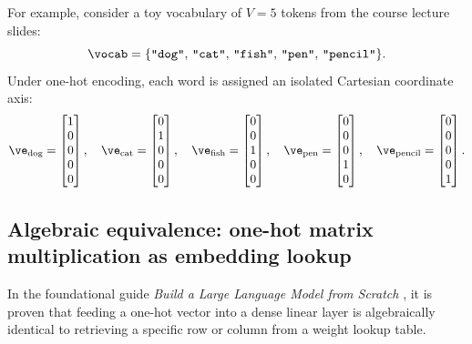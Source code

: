 \documentclass[../../main.tex]{subfiles}
\begin{document}
For example, consider a toy vocabulary of $V=5$ tokens from the course lecture slides:
\begin{equation}
\label{eq:toy_vocab}
\vocab = \{\text{\texttt{"dog"}}, \, \text{\texttt{"cat"}}, \, \text{\texttt{"fish"}}, \, \text{\texttt{"pen"}}, \, \text{\texttt{"pencil"}}\}.
\end{equation}
Under one-hot encoding, each word is assigned an isolated Cartesian coordinate axis:
\begin{equation}
\label{eq:toy_onehots}
\ve_{\text{dog}} = \begin{bmatrix} 1 \\ 0 \\ 0 \\ 0 \\ 0 \end{bmatrix}, \quad
\ve_{\text{cat}} = \begin{bmatrix} 0 \\ 1 \\ 0 \\ 0 \\ 0 \end{bmatrix}, \quad
\ve_{\text{fish}} = \begin{bmatrix} 0 \\ 0 \\ 1 \\ 0 \\ 0 \end{bmatrix}, \quad
\ve_{\text{pen}} = \begin{bmatrix} 0 \\ 0 \\ 0 \\ 1 \\ 0 \end{bmatrix}, \quad
\ve_{\text{pencil}} = \begin{bmatrix} 0 \\ 0 \\ 0 \\ 0 \\ 1 \end{bmatrix}.
\end{equation}

\subsection{Algebraic equivalence: one-hot matrix multiplication as embedding lookup}
\label{subsec:onehot_lookup_proof}

In the foundational guide \emph{Build a Large Language Model from Scratch} \cite{raschka2024llm}, it is proven that feeding a one-hot vector into a dense linear layer is algebraically identical to retrieving a specific row or column from a weight lookup table.
\end{document}
